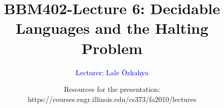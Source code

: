 \documentclass[xcolor=dvipsnames,smaller]{beamer}
\title[BBM402-Lecture 6: Decidable Languages and the Halting Problem]
{BBM402-Lecture 6: Decidable Languages and the Halting Problem}
\author{
\vspace{2cm}
\textcolor{Blue}{\large{Lecturer: Lale \"Ozkahya}}}
\date{
\footnotesize{
Resources for the presentation:\\
https://courses.engr.illinois.edu/cs373/fa2010/lectures}}
\begin{document}
\newtheorem{thm}[theorem] {Theorem}
\newtheorem{lem}[theorem]{Lemma}
\newtheorem{cor}[theorem]{Corollary}
\newtheorem{prp}[theorem]{Proposition}
\newtheorem{clm}[theorem]{Claim}
\newtheorem{conj}[theorem]{Conjecture}
\newtheorem{remark}[theorem]{Remark}
\newtheorem{construction}[theorem]{Construction}

\def\EE{\mathcal{E}}


\def\tr{\textcolor{Red}}
\def\tb{\textcolor{Blue}}
\def\vs{\vspace{0.5cm}}

\begin{frame}
\titlepage
\end{frame}

\normalsize{





}
\end{document}
